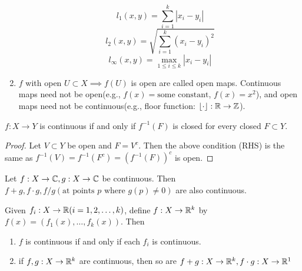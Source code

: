 \begin{theorem}
\begin{remark}
\begin{enumerate}
			      \[
				      l_1(x,y)=\sum_{i=1}^{k}{|x_i-y_i|}
			      \]
			      \[
				      l_2(x,y)=\sqrt{\sum_{i=1}^{k}{(x_i-y_i)^2}}
			      \]
			      \[
				      l_{\infty}(x,y)=\max_{1\le i\le k}{|x_i-y_i|}
			      \]
			\item $f$ with open $U \subset X \implies f(U)$ is open are called open maps. Continuous maps need not be open(e.g., $f(x)=\text{some constant}$, $f(x)=x^2$), and open maps need not be continuous(e.g., floor function: $\left\lfloor \cdot \right\rfloor: \mathbb{R}\to \mathbb{Z}$).
		\end{enumerate}
	\end{remark}
\end{theorem}

\begin{corollary}
	$f:X\to Y$ is continuous if and only if $f^{-1}(F)$ is closed for every closed $F \subset Y$.
	\begin{proof}
		Let $V \subset Y$ be open and $F=V^{c}$. Then the above condition (RHS) is the same as $f^{-1}(V)=f^{-1}(F^{c})=(f^{-1}(F))^{c}$ is open.
	\end{proof}
\end{corollary}


\begin{theorem}[9]
	Let $f: X\to \mathbb{C}, g: X\to \mathbb{C}$ be continuous. Then $f+g, f \cdot g, f/g(\text{at points $p$ where $g(p)\neq 0$})$ are also continuous.
\end{theorem}

\begin{theorem}[10]
	Given $f_i: X\to \mathbb{R}(i=1,2,\ldots ,k)$, define $f: X\to \mathbb{R}^{k}$ by $f(x)=(f_1(x),\ldots ,f_k(x))$.
	Then
	\begin{enumerate}
		\item
		      $f$ is continuous if and only if each $f_i$ is continuous.
		\item if $f,g: X\to \mathbb{R}^{k}$ are continuous, then so are $f+g: X\to \mathbb{R}^{k}, f \cdot g: X\to \mathbb{R}^{1}$
	\end{enumerate}
\end{theorem}


